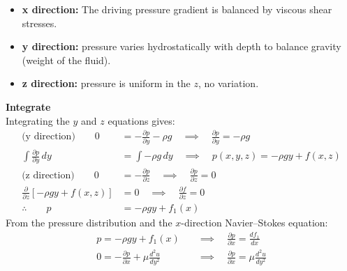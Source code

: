 ﻿\documentclass[12pt]{article}
\begin{document}
\begin{itemize}
    \item \textbf{x direction:} The driving pressure gradient is balanced by viscous shear stresses.
    \item \textbf{y direction:} pressure varies hydrostatically with depth to balance gravity (weight of the fluid).
    \item \textbf{z direction:} pressure is uniform in the $z$, no variation.
\end{itemize}
\textbf{Integrate}\\
Integrating the $y$ and $z$ equations gives:
\[
\begin{aligned}
\text{(y direction)}\qquad
0 &= -\frac{\partial p}{\partial y}-\rho g
\quad\implies\quad \frac{\partial p}{\partial y}=-\rho g\\
\int\frac{\partial p}{\partial y}\,dy &= \int-\rho g\,dy
\quad\implies\quad p(x,y,z)=-\rho gy+f(x,z)\\[8pt]
\text{(z direction)}\qquad
0 &= -\frac{\partial p}{\partial z}
\quad\implies\quad \frac{\partial p}{\partial z}=0\\
\frac{\partial}{\partial z}\left[-\rho gy+f(x,z)\right] &= 0
\quad\implies\quad \frac{\partial f}{\partial z}=0\\[8pt]
\therefore\qquad p &= -\rho gy+f_1(x)
\end{aligned}
\]
From the pressure distribution and the $x$-direction Navier--Stokes equation:
\[
\begin{aligned}
p=-\rho gy+f_1(x)
&\quad\implies\quad
\frac{\partial p}{\partial x}=\frac{df_1}{dx}\\
0=-\frac{\partial p}{\partial x}+\mu\frac{d^2u}{dy^2}
&\quad\implies\quad
\frac{\partial p}{\partial x}=\mu\frac{d^2u}{dy^2}
\end{aligned}
\]
\end{document}
